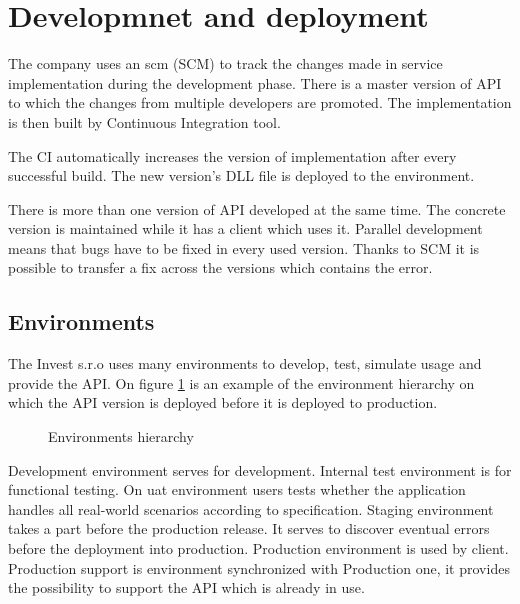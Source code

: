 \section{Developmnet and deployment}
The company uses an \gls{scm} (SCM) to track the changes made in service implementation during the development phase. There is a master version of API to which the changes from multiple developers are promoted. The implementation is then built by Continuous Integration tool. 

The CI automatically increases the version of implementation after every successful build. The new version's DLL file is deployed to the environment. 

There is more than one version of API developed at the same time. The concrete version is maintained while it has a client which uses it. Parallel development means that bugs have to be fixed in every used version. Thanks to SCM it is possible to transfer a fix across the versions which contains the error. 

\subsection{Environments}
The Invest s.r.o uses many environments to develop, test, simulate usage and provide the API. On figure \ref{fig:environments-hierarchy} is an example of the environment hierarchy on which the API version is deployed before it is deployed to production.

\begin{figure}[htp] 
\caption{Environments hierarchy}
\label{fig:environments-hierarchy}
\end{figure} 

Development environment serves for development. Internal test environment is for functional testing. On \gls{uat} environment users tests whether the application handles all real-world scenarios according to specification. Staging environment takes a part before the production release. It serves to discover eventual errors before the deployment into production. Production environment is used by client. Production support is environment synchronized with Production one, it provides the possibility to support the API which is already in use.

